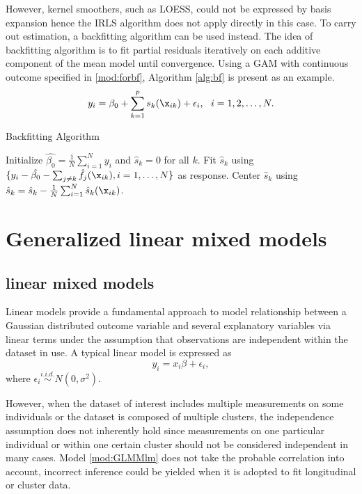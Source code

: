 However, kernel smoothers, such as LOESS, could not be expressed by basis expansion hence the IRLS algorithm does not apply directly in this case. To carry out estimation, a backfitting algorithm \citep{breiman1985estimating} can be used instead. The idea of backfitting algorithm is to fit partial residuals iteratively on each additive component of the mean model until convergence. Using a GAM with continuous outcome specified in \eqref{mod:forbf}, Algorithm \ref{alg:bf} is present as an example. 
\begin{equation} \label{mod:forbf}
y_i =\beta_0+\sum_{k=1}^{p}s_k(\x_{ik})+\epsilon_i,\ \ i=1,2,\dots,N.
\end{equation} 

\begin{algorithm}[h]
	\caption{Backfitting Algorithm}
	\begin{algorithmic}[1]
		\State Initialize $\hat{\beta_0}=\frac{1}{N}\sum_{i=1}^{N}y_i$ and $\hat{s}_k=0$ for all $k$.
		\State Fit $\hat{s}_k$ using $\{y_i-\hat{\beta_0}-\sum_{j\neq k}\hat{f_j}(\x_{ik}),i=1,\dots,N\}$ as response.
		\State Center $\hat{s}_k$ using $\hat{s}_k=\hat{s}_k-\frac{1}{N}\sum_{i=1}^{N}\hat{s}_k(\x_{ik})$.
		\EndFor
		\EndWhile
	\end{algorithmic}
	\label{alg:bf}
\end{algorithm}

\section{Generalized linear mixed models}

\subsection{linear mixed models}
Linear models provide a fundamental approach to model relationship between a Gaussian distributed outcome variable and several explanatory variables via linear terms under the assumption that observations are independent within the dataset in use. A typical linear model is expressed as
\begin{equation} \label{mod:GLMMlm}
y_{i}=x_{i}\beta+\epsilon_{i},
\end{equation}
where $\epsilon_i \stackrel{i.i.d.}{\sim} N(0,\sigma^2)$.

However, when the dataset of interest includes multiple measurements on some individuals or the dataset is composed of multiple clusters, the independence assumption does not inherently hold since measurements on one particular individual or within one certain cluster should not be considered independent in many cases. Model \eqref{mod:GLMMlm} does not take the probable correlation into account, incorrect inference could be yielded when it is adopted to fit longitudinal or cluster data. 

